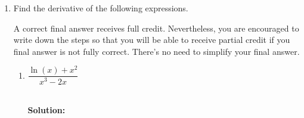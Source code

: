 \documentclass[11pt]{article}
\newcommand{\col}[1]{{\color{blue}#1}} %
\newcommand{\solbf}[1]{~\\ \col{ {\textbf{Solution: }}#1} }
\begin{document}
\begin{enumerate}
If you need to write down your work, please do so at the bottom half of this page, not in the answer space.

\begin{center}
        \begin{tabular}{l c l l c l}
            $\displaystyle\frac{d}{dx}\left[ 9x^{6} \right]$ & $=$ & {\color{blue} $9 \cdot 6 x^5$ }&
            $\displaystyle\frac{d}{dx}\left[ \dfrac{1}{\sqrt[5]{x^3}} \right]$ & $=$ &${\color{blue} -\displaystyle\frac{3}{5} x^{-\frac{8}{5}}}$\\[0.3in]
            $\displaystyle\frac{d}{dx}\left[ \left(\dfrac{3}{4}\right)^x \right]$ & $=$ & ${\color{blue}  \left(\dfrac{3}{4}\right)^x \ln \left(\dfrac{3}{4}\right) } $& 
            $\displaystyle\frac{d}{dx}\left[ \pi^{e} \right]$ & $=$ &$ {\color{blue} 0 }$ \\[0.3in]
            $\displaystyle\frac{d}{dx}\left[ x^5+3 \right]$ & $=$ & ${\color{blue} 5x^4 }$&
            $\displaystyle\frac{d}{dx}\left[ \sqrt{x}-\ln(x) \right]$ & $=$ & ${\color{blue} \dfrac{1}{2} x^{-\frac{1}{2}} - \dfrac{1}{x}}$\\[0.3in]
            $\displaystyle\frac{d}{dx}\left[ \dfrac{x^3+5x^2-x}{x^4} \right]$ & $=$ & ${\color{blue} -x^{-2} - 5\cdot2 x^{-3}+3x^{-4}}$ & 
            $\displaystyle\frac{d}{dx}\left[ \log_{2}(x) \right]$ & $=$ & ${\color{blue} \dfrac{1}{x \ln 2}}$\\[0.3in]
        \end{tabular}        
\end{center}

{
    \color{blue} \textbf{Explanations} (not required to receive full credit)
    TBA
        
}



\newpage


\item Find the derivative of the following expressions. 

A correct final answer receives full credit. Nevertheless, you are encouraged to write down the steps so that you will be able to receive partial credit if you final answer is not fully correct. There's no need to simplify your final answer.
\begin{enumerate}
\item $\dfrac{\ln(x)+x^2}{x^3-2x}$\\
\solbf{ 

}
\end{enumerate}
\end{enumerate}
\end{document}
